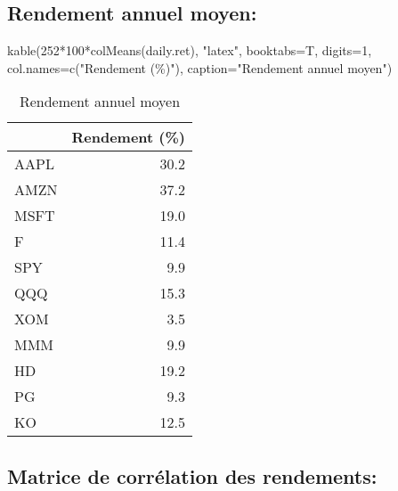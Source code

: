 \documentclass[
]{article}
\newenvironment{Shaded}{\begin{snugshade}}{\end{snugshade}}
\newcommand{\AttributeTok}[1]{\textcolor[rgb]{0.77,0.63,0.00}{#1}}
\newcommand{\DecValTok}[1]{\textcolor[rgb]{0.00,0.00,0.81}{#1}}
\newcommand{\FunctionTok}[1]{\textcolor[rgb]{0.00,0.00,0.00}{#1}}
\newcommand{\NormalTok}[1]{#1}
\newcommand{\SpecialCharTok}[1]{\textcolor[rgb]{0.00,0.00,0.00}{#1}}
\newcommand{\StringTok}[1]{\textcolor[rgb]{0.31,0.60,0.02}{#1}}
\begin{document}
\hypertarget{rendement-annuel-moyen}{%
\subsection{Rendement annuel moyen:}\label{rendement-annuel-moyen}}

\begin{Shaded}
\begin{Highlighting}[]
\FunctionTok{kable}\NormalTok{(}\DecValTok{252}\SpecialCharTok{*}\DecValTok{100}\SpecialCharTok{*}\FunctionTok{colMeans}\NormalTok{(daily.ret), }\StringTok{"latex"}\NormalTok{, }\AttributeTok{booktabs=}\NormalTok{T, }\AttributeTok{digits=}\DecValTok{1}\NormalTok{, }\AttributeTok{col.names=}\FunctionTok{c}\NormalTok{(}\StringTok{"Rendement (\%)"}\NormalTok{), }
      \AttributeTok{caption=}\StringTok{"Rendement annuel moyen"}\NormalTok{)}
\end{Highlighting}
\end{Shaded}

\begin{table}

\caption{\label{tab:unnamed-chunk-2}Rendement annuel moyen}
\centering
\begin{tabular}[t]{lr}
\toprule
  & Rendement (\%)\\
\midrule
AAPL & 30.2\\
AMZN & 37.2\\
MSFT & 19.0\\
F & 11.4\\
SPY & 9.9\\
\addlinespace
QQQ & 15.3\\
XOM & 3.5\\
MMM & 9.9\\
HD & 19.2\\
PG & 9.3\\
\addlinespace
KO & 12.5\\
\bottomrule
\end{tabular}
\end{table}

\hypertarget{matrice-de-corruxe9lation-des-rendements}{%
\subsection{Matrice de corrélation des
rendements:}\label{matrice-de-corruxe9lation-des-rendements}}
\end{document}
